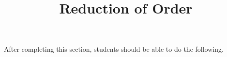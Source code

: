 \documentclass{ximera}
\title{Reduction of Order}
\begin{document}
\begin{abstract}
\end{abstract}

\maketitle

\begin{sectionOutcomes}

After completing this section, students should be able to do the following.

\begin{itemize}
	
\end{itemize}

\end{sectionOutcomes}
\end{document}
